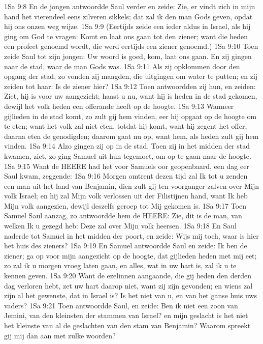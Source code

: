 1Sa 9:8  En de jongen antwoordde Saul verder en zeide: Zie, er vindt zich in mijn hand het vierendeel eens zilveren sikkels; dat zal ik den man Gods geven, opdat hij ons onzen weg wijze.
1Sa 9:9  (Eertijds zeide een ieder aldus in Israel, als hij ging om God te vragen: Komt en laat ons gaan tot den ziener; want die heden een profeet genoemd wordt, die werd eertijds een ziener genoemd.)
1Sa 9:10  Toen zeide Saul tot zijn jongen: Uw woord is goed, kom, laat ons gaan. En zij gingen naar de stad, waar de man Gods was.
1Sa 9:11  Als zij opklommen door den opgang der stad, zo vonden zij maagden, die uitgingen om water te putten; en zij zeiden tot haar: Is de ziener hier?
1Sa 9:12  Toen antwoordden zij hun, en zeiden: Ziet, hij is voor uw aangezicht; haast u nu, want hij is heden in de stad gekomen, dewijl het volk heden een offerande heeft op de hoogte.
1Sa 9:13  Wanneer gijlieden in de stad komt, zo zult gij hem vinden, eer hij opgaat op de hoogte om te eten; want het volk zal niet eten, totdat hij komt, want hij zegent het offer, daarna eten de genodigden; daarom gaat nu op, want hem, als heden zult gij hem vinden.
1Sa 9:14  Alzo gingen zij op in de stad. Toen zij in het midden der stad kwamen, ziet, zo ging Samuel uit hun tegemoet, om op te gaan naar de hoogte.
1Sa 9:15  Want de HEERE had het voor Samuels oor geopenbaard, een dag eer Saul kwam, zeggende:
1Sa 9:16  Morgen omtrent dezen tijd zal Ik tot u zenden een man uit het land van Benjamin, dien zult gij ten voorganger zalven over Mijn volk Israel; en hij zal Mijn volk verlossen uit der Filistijnen hand, want Ik heb Mijn volk aangezien, dewijl deszelfs geroep tot Mij gekomen is.
1Sa 9:17  Toen Samuel Saul aanzag, zo antwoordde hem de HEERE: Zie, dit is de man, van welken Ik u gezegd heb: Deze zal over Mijn volk heersen.
1Sa 9:18  En Saul naderde tot Samuel in het midden der poort, en zeide: Wijs mij toch, waar is hier het huis des zieners?
1Sa 9:19  En Samuel antwoordde Saul en zeide: Ik ben de ziener; ga op voor mijn aangezicht op de hoogte, dat gijlieden heden met mij eet; zo zal ik u morgen vroeg laten gaan, en alles, wat in uw hart is, zal ik u te kennen geven.
1Sa 9:20  Want de ezelinnen aangaande, die gij heden den derden dag verloren hebt, zet uw hart daarop niet, want zij zijn gevonden; en wiens zal zijn al het gewenste, dat in Israel is? Is het niet van u, en van het ganse huis uws vaders?
1Sa 9:21  Toen antwoordde Saul, en zeide: Ben ik niet een zoon van Jemini, van den kleinsten der stammen van Israel? en mijn geslacht is het niet het kleinste van al de geslachten van den stam van Benjamin? Waarom spreekt gij mij dan aan met zulke woorden?
